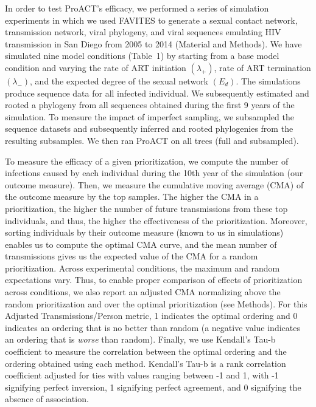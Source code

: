 \documentclass[oupdraft]{sysbio}
\newcommand{\PLWH}{sample\xspace}
\begin{document}
In order to test ProACT's efficacy, we performed a series of simulation experiments in which we used FAVITES \cite{Moshiri2018} to generate a sexual contact network, transmission network, viral phylogeny, and viral sequences emulating HIV transmission in San Diego from 2005 to 2014 (Material and Methods).
We have simulated nine model conditions (Table~1) by starting from a base model condition and varying the rate of ART initiation $(\lambda_+)$, rate of ART termination $(\lambda_-)$, and the expected degree of the sexual network $(E_d)$.
The simulations produce sequence data for all infected individual. 
We subsequently estimated and rooted a phylogeny from all sequences obtained during the first 9 years of the simulation.
To measure the impact of imperfect sampling, we subsampled the sequence datasets and subsequently inferred and rooted phylogenies from the resulting subsamples.
We then ran ProACT on all trees (full and subsampled).

To measure the efficacy of a given prioritization,
we compute the number of infections caused by each individual during the 10th year of the simulation (our outcome measure).
Then, we measure the cumulative moving average (CMA) of the outcome measure by the top \PLWH{s}. 
The higher the CMA in a prioritization, the higher the number of future transmissions from these {top} individuals, and thus, the higher the effectiveness of the prioritization. 
Moreover, sorting individuals by their outcome measure (known to us in simulations) enables us to compute the optimal CMA curve, and the mean number of transmissions gives us the expected value of the CMA for a random prioritization.
Across experimental conditions, the maximum and random expectations vary.
Thus, to enable proper comparison of {effects of prioritization} across conditions,
we also report an adjusted CMA normalizing above the random prioritization and over the optimal prioritization (see Methods).
For this Adjusted Transmissions/Person metric, 1 indicates the optimal ordering and 0 indicates an ordering that is no better than random (a negative value indicates an ordering that is \textit{worse} than random). 
Finally, we use Kendall's Tau-b coefficient to measure the correlation between the optimal ordering and the ordering obtained using each method. 
Kendall's Tau-b is a rank correlation coefficient adjusted for ties \cite{Kendall1938} with values ranging between -1 and 1, with -1 signifying perfect inversion, 1 signifying perfect agreement, and 0 signifying the absence of association.
\end{document}

